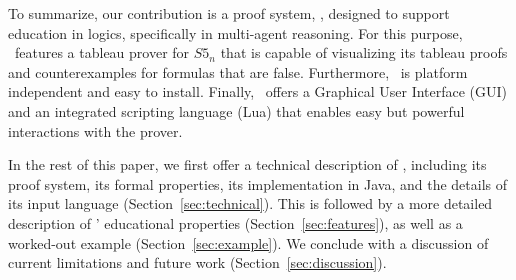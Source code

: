 To summarize, our contribution is a proof system, \oops, designed to support
education in logics, specifically in multi-agent reasoning. For this purpose,
\oops\ features a tableau prover for $S5_n$ that is capable of visualizing its
tableau proofs and counterexamples for formulas that are false. Furthermore,
\oops\ is platform independent and easy to install. Finally, \oops\ offers a
Graphical User Interface (GUI) and an integrated scripting language (Lua) that
enables easy but powerful interactions with the prover.
 
In the rest of this paper, we first offer a technical description of \oops,
including its proof system, its formal properties, its implementation in Java,
and the details of its input language (Section~\ref{sec:technical}).
This is followed by a more detailed description of \oops' educational
properties (Section~\ref{sec:features}), as well as a worked-out example
(Section~\ref{sec:example}).
We conclude with a discussion of current limitations and future work
(Section~\ref{sec:discussion}).
